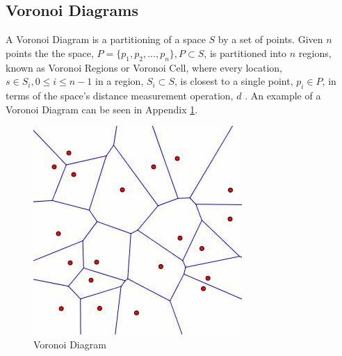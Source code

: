 \subsection{Voronoi Diagrams}\label{tess}
A Voronoi Diagram is a partitioning of a space $S$ by a set of points. Given $n$ points the the space, $P = \{p_1,p_2,...,p_n\}, P \subset S$, is partitioned into $n$ regions, known as Voronoi Regions or Voronoi Cell, where every location, $s \in S_i,0 \leq i \leq n-1$ in a region, $S_i \subset S$, is closest to a single point, $p_i \in P$, in terms of the space's distance measurement operation, $d$ \cite{okabe2009spatial}. An example of a Voronoi Diagram can be seen in Appendix \ref{voronoipic}.
\begin{figure}[H]
	\centering
    \label{voronoipic}
    \includegraphics[scale=0.65]{Images/voronoi.jpg}
    \caption{Voronoi Diagram\cite{voronoipic}}
\end{figure}
